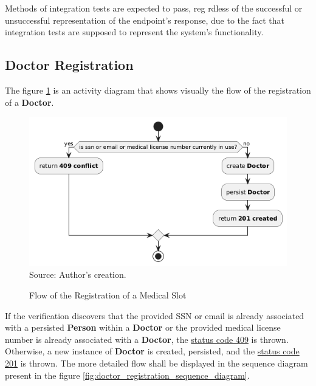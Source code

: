 Methods of integration tests are expected to pass, reg rdless of the successful or unsuccessful representation of the endpoint's response, due to the fact that integration tests are supposed to represent the system's functionality.

\subsection{Doctor Registration}

The figure \ref{fig:doctor_registration_activity_diagram} is an activity diagram that shows visually the flow of the registration of a \textbf{Doctor}.
\begin{figure}[H]
	\centering
	\caption{Flow of the Registration of a Medical Slot}
	\includegraphics[width=1\linewidth]{figures/doctor_registration_activity_diagram.png}
	\\ \footnotesize Source: Author's creation.
	\label{fig:doctor_registration_activity_diagram}
\end{figure}

If the verification discovers that the provided SSN or email is already associated with a persisted \textbf{Person} within a \textbf{Doctor} or the provided medical license number is already associated with a \textbf{Doctor}, the \hyperref[tab:summary_http_status_codes]{status code 409} is thrown. Otherwise, a new instance of \textbf{Doctor} is created,  persisted, and the \hyperref[tab:summary_http_status_codes]{status code 201} is thrown. The more detailed flow shall be displayed in the sequence diagram present in the figure \ref{fig:doctor_registration_sequence_diagram}.

